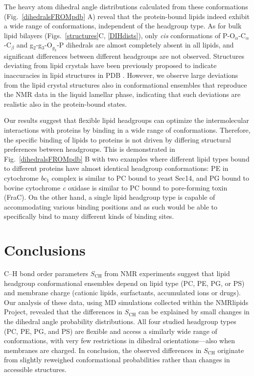 \documentclass[aps,prl,superscriptaddress,twocolumn]{revtex4}
\begin{document}
The heavy atom dihedral angle distributions calculated from these conformations 
(Fig.~\ref{dihedralsFROMpdb} A) reveal that the protein-bound lipids indeed exhibit a wide
range of conformations, independent of the headgroup type.
As for bulk lipid bilayers (Figs.~\ref{structures}C, \ref{DIHdists}), only {\it cis} conformations
of P-O$_\alpha$-C$_\alpha$-C$_\beta$ and g$_2$-g$_3$-O$_{g_3}$-P dihedrals are almost
completely absent in all lipids, and significant differences between
different headgroups are not observed.
Structures deviating from lipid crystals 
have been previously proposed to indicate inaccuracies in lipid structures in PDB \cite{marsh13b,pezeshkian18}. 
However, we observe large deviations from the lipid crystal structures also in conformational ensembles
that reproduce the NMR data in the liquid lamellar phase, indicating that such deviations
are realistic also in the protein-bound states.


Our results suggest that flexible lipid headgroups can optimize the intermolecular interactions with proteins by binding
in a wide range of conformations.
Therefore, the specific binding of lipids to proteins is not driven by differing structural preferences between headgroups.
This is demonstrated in Fig.~\ref{dihedralsFROMpdb} B with two examples where different lipid types bound to
different proteins have almost identical headgroup conformations:
PE in cytochrome {\it bc}$_1$ complex is similar to PC bound to yeast Sec14,
and PG bound to bovine cytochrome {\it c} oxidase is similar to PC bound to pore-forming toxin (FraC).
On the other hand, a single lipid headgroup type is capable of accommodating various binding positions and as such would 
be able to specifically bind to many different kinds of binding sites.



\section{Conclusions}

C--H bond order parameters $S_\mathrm{CH}$ from NMR experiments %
suggest that lipid headgroup conformational ensembles depend on lipid type (PC, PE, PG, or PS) 
and membrane charge (cationic lipids, surfactants, accumulated ions or drugs). 
Our analysis of these data, using MD simulations collected
within the NMRlipids Project,
revealed that the differences in $S_\mathrm{CH}$ can be explained
by small changes in the dihedral angle probability distributions.
All four studied headgroup types (PC, PE, PG, and PS) are flexible
and access a similarly wide range of conformations, with very few restrictions in dihedral orientations---also when membranes are charged.
In conclusion, the observed differences in $S_\mathrm{CH}$ originate from
slightly reweighed conformational probabilities rather than changes in accessible structures.
\end{document}
